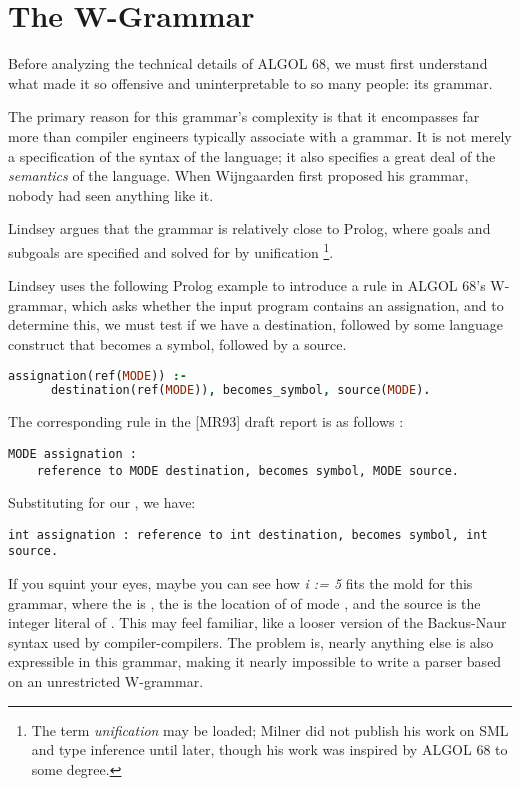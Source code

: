 \section{The W-Grammar}

Before analyzing the technical details of ALGOL 68, we must first understand
what made it so offensive and uninterpretable to so many people: its grammar.

The primary reason for this grammar's complexity is that it encompasses
far more than compiler engineers typically associate with a grammar.
It is not merely a specification of the syntax of the language;
it also specifies a great deal of the \textit{semantics} of the language.
When Wijngaarden first proposed his grammar, nobody had seen anything like it.

Lindsey argues that the grammar is relatively close to Prolog, where
goals and subgoals are specified and solved for by unification
\footnote{The term \textit{unification} may be loaded; Milner did not publish
his work on SML and type inference until later, though his work was inspired by
ALGOL 68 to some degree.}.

Lindsey uses the following Prolog example to introduce a rule in ALGOL 68's W-grammar,
which asks whether the input program contains an assignation, and to determine this,
we must test if we have a destination, followed by some language construct that
becomes a symbol, followed by a source.

\begin{lstlisting}[language=prolog,frame=single]
assignation(ref(MODE)) :-
      destination(ref(MODE)), becomes_symbol, source(MODE). 
\end{lstlisting}

The corresponding rule in the [MR93] draft report is as follows
\cite{draft_report_algol_1968}:
\begin{lstlisting}[frame=single]
MODE assignation :
    reference to MODE destination, becomes symbol, MODE source.
\end{lstlisting}

Substituting  for our , we have:
\begin{lstlisting}[frame=single]
int assignation : reference to int destination, becomes symbol, int source.
\end{lstlisting}

If you squint your eyes, maybe you can see how \textit{i := 5} fits the mold for this
grammar, where the  is , the  is
the location of  of mode , and the source is
the integer literal  of .
This may feel familiar, like a looser version of the Backus-Naur
syntax used by compiler-compilers.
The problem is, nearly anything else is also expressible in this grammar,
making it nearly impossible to write a parser based on an unrestricted W-grammar.

